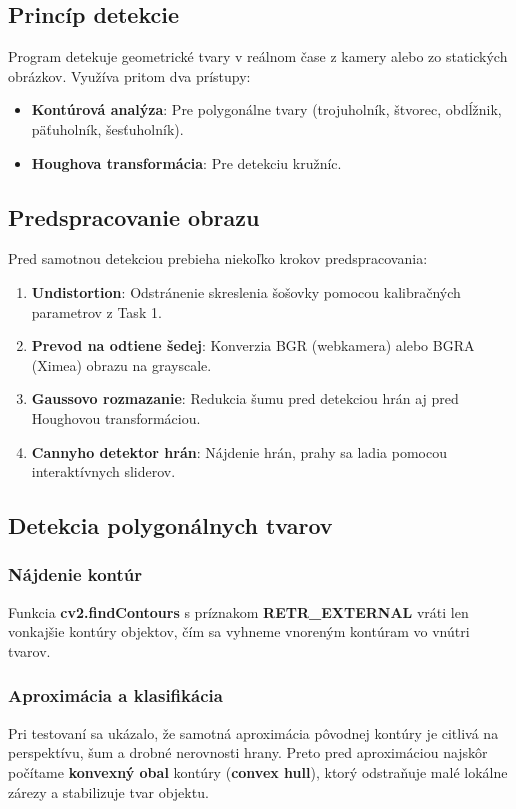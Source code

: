 \documentclass[a4paper, 12pt]{article}
\begin{document}
\subsection{Princíp detekcie}
Program detekuje geometrické tvary v reálnom čase z kamery alebo zo statických obrázkov. Využíva pritom dva prístupy:

\begin{itemize}
    \item \textbf{Kontúrová analýza}: Pre polygonálne tvary (trojuholník, štvorec, obdĺžnik, päťuholník, šesťuholník).
    \item \textbf{Houghova transformácia}: Pre detekciu kružníc.
\end{itemize}

\subsection{Predspracovanie obrazu}
Pred samotnou detekciou prebieha niekoľko krokov predspracovania:

\begin{enumerate}
    \item \textbf{Undistortion}: Odstránenie skreslenia šošovky pomocou kalibračných parametrov z Task 1.
    \item \textbf{Prevod na odtiene šedej}: Konverzia BGR (webkamera) alebo BGRA (Ximea) obrazu na grayscale.
    \item \textbf{Gaussovo rozmazanie}: Redukcia šumu pred detekciou hrán aj pred Houghovou transformáciou.
    \item \textbf{Cannyho detektor hrán}: Nájdenie hrán, prahy sa ladia pomocou interaktívnych sliderov.
\end{enumerate}

\subsection{Detekcia polygonálnych tvarov}

\subsubsection*{Nájdenie kontúr}
Funkcia \textbf{cv2.findContours} s príznakom \textbf{RETR\_EXTERNAL} vráti len vonkajšie kontúry objektov, čím sa vyhneme vnoreným kontúram vo vnútri tvarov.

\subsubsection*{Aproximácia a klasifikácia}
Pri testovaní sa ukázalo, že samotná aproximácia pôvodnej kontúry je citlivá na perspektívu, šum a drobné nerovnosti hrany. Preto pred aproximáciou najskôr počítame \textbf{konvexný obal} kontúry (\textbf{convex hull}), ktorý odstraňuje malé lokálne zárezy a stabilizuje tvar objektu.
\end{document}
